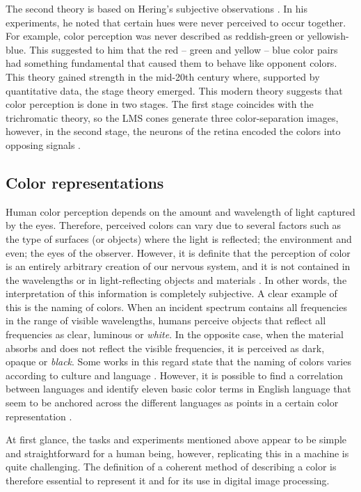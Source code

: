 The second theory is based on Hering's subjective observations \citep{Hering:Book:1878}. In his experiments, he noted that certain hues were never perceived to occur together. For example, color perception was never described as reddish-green or yellowish-blue. This suggested to him that the red – green and yellow – blue color pairs had something fundamental that caused them to behave like opponent colors. 
This theory gained strength in the mid-20th century where, supported by quantitative data, the stage theory emerged. This modern theory suggests that color perception is done in two stages. The first stage coincides with the trichromatic theory, so the LMS cones generate three color-separation images, however, in the second stage, the neurons of the retina encoded the colors into opposing signals \citep{Fairchild:Book:2005}. 

\subsection{Color representations}
Human color perception depends on the amount and wavelength of light captured by the eyes. Therefore, perceived colors can vary due to several factors such as the type of surfaces (or objects) where the light is reflected; the environment and even; the eyes of the observer. However, it is definite that the perception of color is an entirely arbitrary creation of our nervous system, and it is not contained in the wavelengths or in light-reflecting objects and materials \citep{Goldstein:Book:2009}. In other words, the interpretation of this information is completely subjective. A clear example of this is the naming of colors. When an incident spectrum contains all frequencies in the range of visible wavelengths, humans perceive objects that reflect all frequencies as clear, luminous or \textit{white}. In the opposite case, when the material absorbs and does not reflect the visible frequencies, it is perceived as dark, opaque or \textit{black}. Some works in this regard state that the naming of colors varies according to culture and language \citep{Berlin.Kay:Book:1991}. However, it is possible to find a correlation between languages and identify eleven basic color terms in English language that seem to be anchored across the different languages as points in a certain color representation \citep{Kay.Regier:PNAS:2003}.%

At first glance, the tasks and experiments mentioned above appear to be simple and straightforward for a human being, however, replicating this in a machine is quite challenging. The definition of a coherent method of describing a color is therefore essential to represent it and for its use in digital image processing. 

